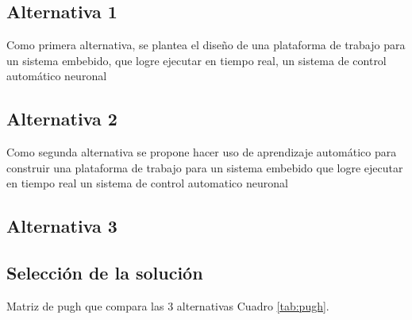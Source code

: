 \documentclass[12pt]{article}
\begin{document}
\subsection{Alternativa 1}


Como primera alternativa, se plantea el diseño de una plataforma de trabajo para un sistema embebido, que logre ejecutar en tiempo real, un sistema de control automático neuronal

\subsection{Alternativa 2}

Como segunda alternativa se propone hacer uso de aprendizaje automático para construir una plataforma de trabajo para un sistema embebido que logre ejecutar en tiempo real un sistema de control automatico neuronal


\subsection{Alternativa 3}


\subsection{Selección de la solución}

Matriz de pugh que compara las 3 alternativas Cuadro \ref{tab:pugh}.
\end{document}
